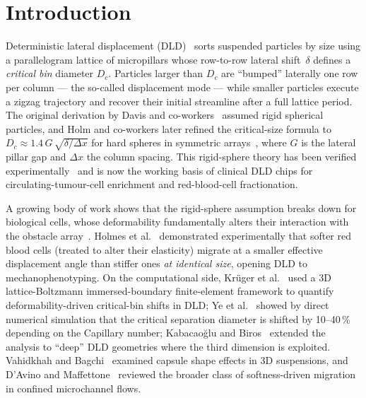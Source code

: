 \documentclass[11pt,a4paper]{article}
\begin{document}
\section{Introduction}
\label{sec:intro}

Deterministic lateral displacement
(DLD)~\citep{huang2004continuous,davis2006deterministic} sorts
suspended particles by size using a parallelogram lattice of
micropillars whose row-to-row lateral shift~$\delta$ defines a
\emph{critical bin} diameter $D_c$. Particles larger than $D_c$ are
``bumped'' laterally one row per column ---  the so-called
displacement mode --- while smaller particles execute a zigzag
trajectory and recover their initial streamline after a full lattice
period. The original derivation by Davis and
co-workers~\citep{davis2006deterministic,inglis2006critical} assumed
rigid spherical particles, and Holm and co-workers later refined the
critical-size formula to $D_c \approx 1.4\,G\,\sqrt{\delta/\Delta x}$
for hard spheres in symmetric arrays~\citep{holm2011separation},
where $G$ is the lateral pillar gap and $\Delta x$ the column
spacing. This rigid-sphere theory has been verified
experimentally~\citep{mcgrath2014deterministic} and is now the
working basis of clinical DLD chips for circulating-tumour-cell
enrichment and red-blood-cell fractionation.

A growing body of work shows that the rigid-sphere assumption breaks
down for biological cells, whose deformability fundamentally alters
their interaction with the obstacle
array~\citep{quek2011separation,beech2012sorting,zhang2019sharp}.
Holmes et al.~\citep{holmes2014separation} demonstrated
experimentally that softer red blood cells (treated to alter their
elasticity) migrate at a smaller effective displacement angle than
stiffer ones \emph{at identical size}, opening DLD to
mechanophenotyping. On the computational side, Kr{\"u}ger et
al.~\citep{kruger2014deformability} used a 3D lattice-Boltzmann
immersed-boundary finite-element framework to quantify
deformability-driven critical-bin shifts in DLD; Ye et
al.~\citep{ye2014effects} showed by direct numerical simulation
that the critical separation diameter is shifted by 10--40\,\%
depending on the Capillary number; Kabacao{\u{g}}lu and
Biros~\citep{kabacaoglu2018sorting} extended the analysis to
``deep'' DLD geometries where the third dimension is exploited.
Vahidkhah and Bagchi~\citep{vahidkhah2015microparticle} examined
capsule shape effects in 3D suspensions, and D'Avino and
Maffettone~\citep{davino2015particle} reviewed the broader class of
softness-driven migration in confined microchannel flows.
\end{document}

